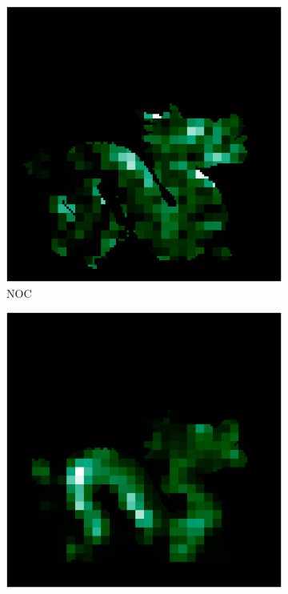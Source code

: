 \begin{figure}[H]
\begin{minipage}{0.32\linewidth}
				\begin{subfigure}[t]{0.45\linewidth}
					\includegraphics[width=\linewidth]{./Figures/feature_map_gcnn/feature_map_gcnn-noc_11.png}
					\caption{NOC}
				\end{subfigure}
				\begin{subfigure}[t]{0.45\linewidth}
				\includegraphics[width=\linewidth]{./Figures/feature_map_gcnn/feature_map_gcnn-noc_127.png}
				\end{subfigure}
			

\end{minipage}
\end{figure}
